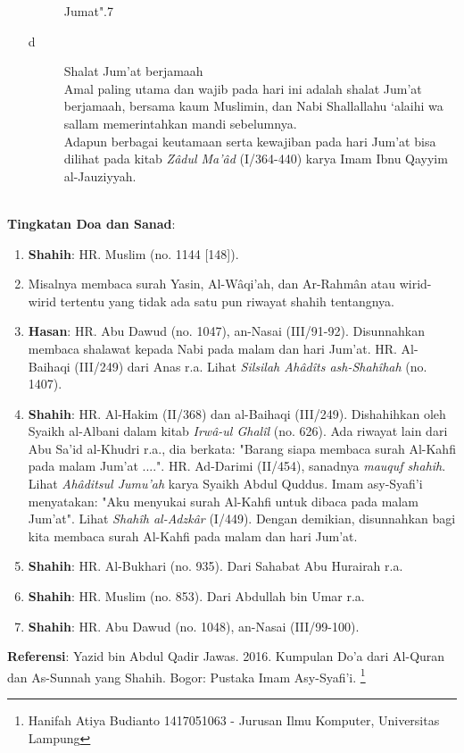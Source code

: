\documentclass[a4paper,12pt]{article}
\begin{document}
\begin{enumerate}
\begin{description}
Jumat".{\scriptsize 7}\\
\item[d]Shalat Jum'at berjamaah\\
\indent Amal paling utama dan wajib pada hari ini adalah shalat Jum'at 
berjamaah, bersama kaum Muslimin, dan Nabi Shallallahu ‘alaihi wa sallam memerintahkan mandi sebelumnya.\\
\indent Adapun berbagai keutamaan serta kewajiban pada hari Jum'at bisa 
dilihat pada kitab \textit{Z\^{a}dul Ma'\^{a}d} (I/364-440) karya Imam Ibnu
Qayyim al-Jauziyyah.\\\\
\end{description}
\end{enumerate}
\par
\noindent
\textbf{Tingkatan Doa dan Sanad}:
\begin{enumerate}
\item \textbf{Shahih}: HR. Muslim (no. 1144 [148]).
\item Misalnya membaca surah Yasin, Al-W\^{a}qi'ah, dan Ar-Rahm\^{a}n atau 
wirid-wirid tertentu yang tidak ada satu pun riwayat shahih tentangnya.
\item \textbf{Hasan}: HR. Abu Dawud (no. 1047), an-Nasai (III/91-92). 
Disunnahkan membaca shalawat kepada Nabi pada malam dan hari Jum'at. HR. 
Al-Baihaqi (III/249) dari Anas r.a. Lihat \textit{Silsilah Ah\^{a}d\^{i}ts 
ash-Shah\^{i}hah} (no. 1407).
\item \textbf{Shahih}: HR. Al-Hakim (II/368) dan al-Baihaqi (III/249). 
Dishahihkan oleh Syaikh al-Albani dalam kitab \textit{Irw\^{a}-ul 
Ghal\^{i}l} (no. 626). Ada riwayat lain dari Abu Sa'id al-Khudri r.a., dia 
berkata: "Barang siapa membaca surah Al-Kahfi pada malam Jum'at ....". HR. 
Ad-Darimi (II/454), sanadnya \textit{mauquf shahih}. Lihat 
\textit{Ah\^{a}ditsul Jumu'ah} karya Syaikh Abdul Quddus. Imam asy-Syafi'i 
menyatakan: "Aku menyukai surah Al-Kahfi untuk dibaca pada malam Jum'at". 
Lihat \textit{Shah\^{i}h al-Adzk\^{a}r} (I/449). Dengan demikian, 
disunnahkan bagi kita membaca surah Al-Kahfi pada malam dan hari Jum'at.
\item \textbf{Shahih}: HR. Al-Bukhari (no. 935). Dari Sahabat Abu Hurairah 
r.a.
\item \textbf{Shahih}: HR. Muslim (no. 853). Dari Abdullah bin Umar r.a.
\item \textbf{Shahih}: HR. Abu Dawud (no. 1048), an-Nasai (III/99-100).
\end{enumerate}
\textbf{Referensi}: Yazid bin Abdul Qadir Jawas. 2016. Kumpulan Do'a dari
Al-Quran dan As-Sunnah yang Shahih. Bogor: Pustaka Imam Asy-Syafi'i.
\footnote{Hanifah Atiya Budianto 1417051063 - Jurusan Ilmu Komputer,
Universitas Lampung}
\end{document}
